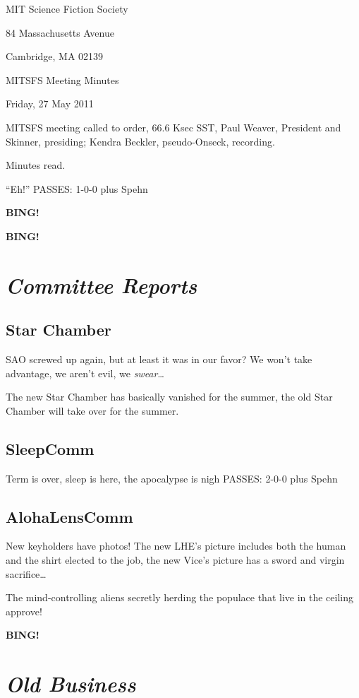 \documentclass[10pt]{article}
\newcommand{\bing}{{\bf BING!} }
\newcommand{\goto}[1]{\bing \vskip 12pt \section*{{\em{#1}}}}
\newcommand{\ps}{ plus Spehn\xspace}
\newcommand{\skinner}{Paul Weaver, President and Skinner}
\newcommand{\onseck}{Kendra Beckler, pseudo-Onseck}
\newcommand{\meetingdate}{Friday, 27 May 2011}
\begin{document}
\begin{center}

MIT Science Fiction Society

84 Massachusetts Avenue

Cambridge, MA 02139

\vspace{12pt}

MITSFS Meeting Minutes

\meetingdate

\end{center}

\vspace{18pt}

\setlength{\parskip}{6pt}

\noindent
MITSFS meeting called to order, 66.6 Ksec SST,
\skinner, presiding; \onseck, recording.

Minutes read.

``Eh!'' PASSES: 1-0-0 \ps

\bing

\goto{Committee Reports}

\subsection*{Star Chamber}

SAO screwed up again, but at least it was in our favor?  We won't take advantage, we aren't evil, we \textit{swear}\ldots

The new Star Chamber has basically vanished for the summer, the old Star Chamber will take over for the summer.

\subsection*{SleepComm}

Term is over, sleep is here, the apocalypse is nigh PASSES: 2-0-0 \ps

\subsection*{AlohaLensComm}

New keyholders have photos!  The new LHE's picture includes both the human and
the shirt elected to the job, the new Vice's picture has a sword and virgin
sacrifice\ldots

The mind-controlling aliens secretly herding the populace that live in the ceiling approve!

\goto{Old Business}
\end{document}
